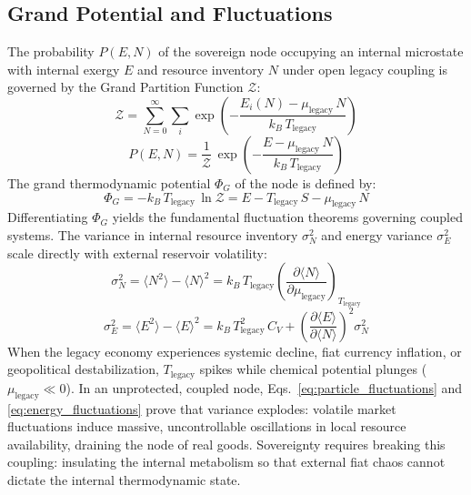 \subsection{Grand Potential and Fluctuations}
The probability $P(E, N)$ of the sovereign node occupying an internal microstate with internal exergy $E$ and resource inventory $N$ under open legacy coupling is governed by the Grand Partition Function $\mathcal{Z}$:
\begin{equation}
\mathcal{Z} = \sum_{N=0}^{\infty} \sum_{i} \exp\left( -\frac{E_i(N) - \mu_{\mathrm{legacy}} \, N}{k_B \, T_{\mathrm{legacy}}} \right)
\label{eq:grand_partition_function}
\end{equation}
\begin{equation}
P(E, N) = \frac{1}{\mathcal{Z}} \, \exp\left( -\frac{E - \mu_{\mathrm{legacy}} \, N}{k_B \, T_{\mathrm{legacy}}} \right)
\label{eq:grand_canonical_prob}
\end{equation}
The grand thermodynamic potential $\Phi_G$ of the node is defined by:
\begin{equation}
\Phi_G = -k_B \, T_{\mathrm{legacy}} \, \ln \mathcal{Z} = E - T_{\mathrm{legacy}} \, S - \mu_{\mathrm{legacy}} \, N
\label{eq:grand_potential}
\end{equation}
Differentiating $\Phi_G$ yields the fundamental fluctuation theorems governing coupled systems. The variance in internal resource inventory $\sigma_N^2$ and energy variance $\sigma_E^2$ scale directly with external reservoir volatility:
\begin{equation}
\sigma_N^2 = \langle N^2 \rangle - \langle N \rangle^2 = k_B \, T_{\mathrm{legacy}} \left( \frac{\partial \langle N \rangle}{\partial \mu_{\mathrm{legacy}}} \right)_{T_{\mathrm{legacy}}}
\label{eq:particle_fluctuations}
\end{equation}
\begin{equation}
\sigma_E^2 = \langle E^2 \rangle - \langle E \rangle^2 = k_B \, T_{\mathrm{legacy}}^2 \, C_V + \left( \frac{\partial \langle E \rangle}{\partial \langle N \rangle} \right)^2 \sigma_N^2
\label{eq:energy_fluctuations}
\end{equation}
When the legacy economy experiences systemic decline, fiat currency inflation, or geopolitical destabilization, $T_{\mathrm{legacy}}$ spikes while chemical potential plunges ($\mu_{\mathrm{legacy}} \ll 0$). In an unprotected, coupled node, Eqs.~\ref{eq:particle_fluctuations} and \ref{eq:energy_fluctuations} prove that variance explodes: volatile market fluctuations induce massive, uncontrollable oscillations in local resource availability, draining the node of real goods. Sovereignty requires breaking this coupling: insulating the internal metabolism so that external fiat chaos cannot dictate the internal thermodynamic state.


